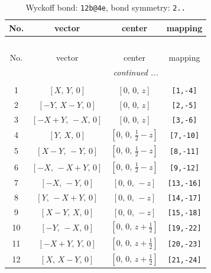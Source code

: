 \documentclass[fleqn,8pt]{jsarticle}
\begin{document}
\renewcommand{\arraystretch}{1.2}
\begin{longtable}{cccc}
\caption{Wyckoff bond: {\tt 12b@4e}, bond symmetry: {\tt 2..}}
 \\
 \hline \hline
No. & vector & center & mapping \\ \hline \endfirsthead

\multicolumn{3}{l}{\tablename\ \thetable{}} \\
 \hline \hline
No. & vector & center & mapping \\ \hline \endhead

 \hline \hline
\multicolumn{3}{r}{\footnotesize\it continued ...} \\ \endfoot

 \hline \hline
\multicolumn{3}{r}{} \\ \endlastfoot

1 & $\left[ X,\, Y,\, 0 \right]$ & $\left[ 0,\, 0,\, z \right]$ & {\tt [1,-4]} \\ \hline
2 & $\left[ - Y,\, X - Y,\, 0 \right]$ & $\left[ 0,\, 0,\, z \right]$ & {\tt [2,-5]} \\ \hline
3 & $\left[ - X + Y,\, - X,\, 0 \right]$ & $\left[ 0,\, 0,\, z \right]$ & {\tt [3,-6]} \\ \hline
4 & $\left[ Y,\, X,\, 0 \right]$ & $\left[ 0,\, 0,\, \frac{1}{2} - z \right]$ & {\tt [7,-10]} \\ \hline
5 & $\left[ X - Y,\, - Y,\, 0 \right]$ & $\left[ 0,\, 0,\, \frac{1}{2} - z \right]$ & {\tt [8,-11]} \\ \hline
6 & $\left[ - X,\, - X + Y,\, 0 \right]$ & $\left[ 0,\, 0,\, \frac{1}{2} - z \right]$ & {\tt [9,-12]} \\ \hline
7 & $\left[ - X,\, - Y,\, 0 \right]$ & $\left[ 0,\, 0,\, - z \right]$ & {\tt [13,-16]} \\ \hline
8 & $\left[ Y,\, - X + Y,\, 0 \right]$ & $\left[ 0,\, 0,\, - z \right]$ & {\tt [14,-17]} \\ \hline
9 & $\left[ X - Y,\, X,\, 0 \right]$ & $\left[ 0,\, 0,\, - z \right]$ & {\tt [15,-18]} \\ \hline
10 & $\left[ - Y,\, - X,\, 0 \right]$ & $\left[ 0,\, 0,\, z + \frac{1}{2} \right]$ & {\tt [19,-22]} \\ \hline
11 & $\left[ - X + Y,\, Y,\, 0 \right]$ & $\left[ 0,\, 0,\, z + \frac{1}{2} \right]$ & {\tt [20,-23]} \\ \hline
12 & $\left[ X,\, X - Y,\, 0 \right]$ & $\left[ 0,\, 0,\, z + \frac{1}{2} \right]$ & {\tt [21,-24]} \\
\end{longtable}
\end{document}
